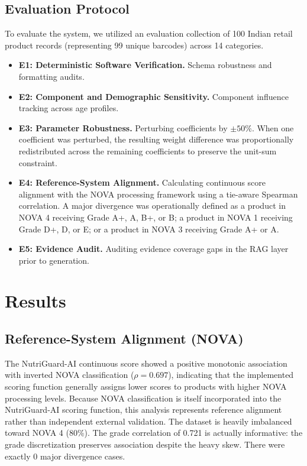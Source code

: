 \documentclass[conference]{IEEEtran}
\begin{document}
\subsection{Evaluation Protocol}
To evaluate the system, we utilized an evaluation collection of 100 Indian retail product records (representing 99 unique barcodes) across 14 categories.
\begin{itemize}
    \item \textbf{E1: Deterministic Software Verification.} Schema robustness and formatting audits.
    \item \textbf{E2: Component and Demographic Sensitivity.} Component influence tracking across age profiles.
    \item \textbf{E3: Parameter Robustness.} Perturbing coefficients by $\pm 50\%$. When one coefficient was perturbed, the resulting weight difference was proportionally redistributed across the remaining coefficients to preserve the unit-sum constraint.
    \item \textbf{E4: Reference-System Alignment.} Calculating continuous score alignment with the NOVA processing framework using a tie-aware Spearman correlation. A major divergence was operationally defined as a product in NOVA 4 receiving Grade A+, A, B+, or B; a product in NOVA 1 receiving Grade D+, D, or E; or a product in NOVA 3 receiving Grade A+ or A.
    \item \textbf{E5: Evidence Audit.} Auditing evidence coverage gaps in the RAG layer prior to generation.
\end{itemize}

\section{Results}
\subsection{Reference-System Alignment (NOVA)}
The NutriGuard-AI continuous score showed a positive monotonic association with inverted NOVA classification ($\rho=0.697$), indicating that the implemented scoring function generally assigns lower scores to products with higher NOVA processing levels. Because NOVA classification is itself incorporated into the NutriGuard-AI scoring function, this analysis represents reference alignment rather than independent external validation. The dataset is heavily imbalanced toward NOVA 4 (80\%). The grade correlation of 0.721 is actually informative: the grade discretization preserves association despite the heavy skew. There were exactly 0 major divergence cases.
\end{document}

